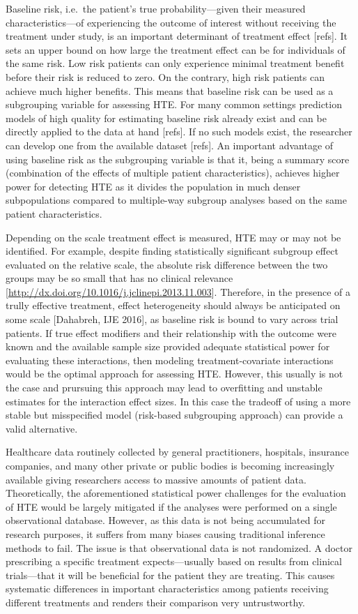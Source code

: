 \documentclass[
]{book}
\begin{document}
Baseline risk, i.e.~the patient's true probability---given their measured
characteristics---of experiencing the outcome of interest without receiving the
treatment under study, is an important determinant of treatment effect
{[}refs{]}. It sets an upper bound on how large the treatment effect can be for
individuals of the same risk. Low risk patients can only experience minimal
treatment benefit before their risk is reduced to zero. On the contrary, high
risk patients can achieve much higher benefits. This means that baseline risk
can be used as a subgrouping variable for assessing HTE. For many common
settings prediction models of high quality for estimating baseline risk already
exist and can be directly applied to the data at hand {[}refs{]}. If no such models
exist, the researcher can develop one from the available dataset {[}refs{]}. An
important advantage of using baseline risk as the subgrouping variable is that
it, being a summary score (combination of the effects of multiple patient
characteristics), achieves higher power for detecting HTE as it divides the
population in much denser subpopulations compared to multiple-way subgroup
analyses based on the same patient characteristics.

Depending on the scale treatment effect is measured, HTE may or may not be
identified. For example, despite finding statistically significant subgroup effect
evaluated on the relative scale, the absolute risk difference between the two
groups may be so small that has no clinical relevance
{[}\url{http://dx.doi.org/10.1016/j.jclinepi.2013.11.003}{]}. Therefore, in the presence
of a trully effective treatment, effect heterogeneity should always be
anticipated on some scale {[}Dahabreh, IJE 2016{]}, as baseline risk is bound to
vary across trial patients. If true effect modifiers and their relationship with
the outcome were known and the available sample size provided adequate
statistical power for evaluating these interactions, then modeling
treatment-covariate interactions would be the optimal approach for assessing
HTE. However, this usually is not the case and prursuing this approach may lead
to overfitting and unstable estimates for the interaction effect sizes. In this
case the tradeoff of using a more stable but misspecified model (risk-based
subgrouping approach) can provide a valid alternative.

Healthcare data routinely collected by general practitioners, hospitals,
insurance companies, and many other private or public bodies is becoming
increasingly available giving researchers access to massive amounts of patient
data. Theoretically, the aforementioned statistical power challenges for the
evaluation of HTE would be largely mitigated if the analyses were performed on a
single observational database. However, as this data is not being accumulated
for research purposes, it suffers from many biases causing traditional inference
methods to fail. The issue is that observational data is not randomized. A
doctor prescribing a specific treatment expects---usually based on results from
clinical trials---that it will be beneficial for the patient they are
treating. This causes systematic differences in important characteristics among
patients receiving different treatments and renders their comparison very
untrustworthy.
\end{document}
